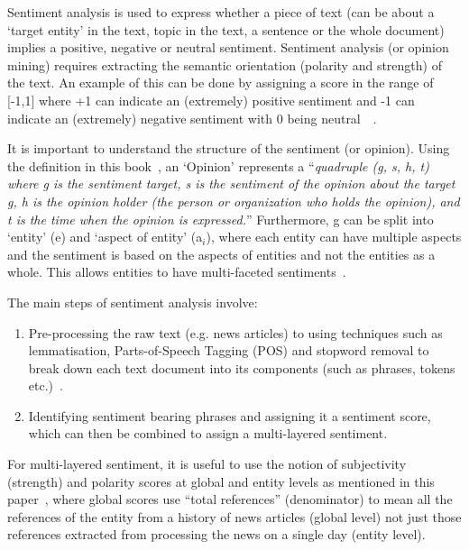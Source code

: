 Sentiment analysis is used to express whether a piece of text (can be about a `target entity' in the text, topic in the text, a sentence or the whole document) implies a positive, negative or neutral sentiment. Sentiment analysis (or opinion mining) requires extracting the semantic orientation (polarity and strength) of the text. An example of this can be done by assigning a score in the range of [-1,1] where +1 can indicate an (extremely) positive sentiment and -1 can indicate an (extremely) negative sentiment with 0 being neutral~\cite{16_liu2012sentiment}~\cite{18_kanakaraj2015nlp}. 

It is important to understand the structure of the sentiment (or opinion). Using the definition in this book~\cite{16_liu2012sentiment}, an `Opinion' represents a ``\textit{quadruple (g, s, h, t) where g is the sentiment target, s is the sentiment of the opinion about the target g,
h is the opinion holder (the person or organization who holds the opinion), and t is the time when the opinion is expressed.}'' Furthermore, g can be split into `entity' (e) and `aspect of entity' (a$_{i}$), where each entity can have multiple aspects and the sentiment is based on the aspects of entities and not the entities as a whole. This allows entities to have multi-faceted sentiments~\cite{18_kanakaraj2015nlp}. 

The main steps of sentiment analysis involve: 
\begin{enumerate}
\item Pre-processing the raw text (e.g. news articles) to using techniques such as lemmatisation, Parts-of-Speech Tagging (POS) and stopword removal to break down each text document into its components (such as phrases, tokens etc.)~\cite{17_benamara2007sentiment}.
\item Identifying sentiment bearing phrases and assigning it a sentiment score, which can then be combined to assign a multi-layered sentiment.
\end{enumerate}

For multi-layered sentiment, it is useful to use the notion of subjectivity (strength) and polarity scores at global and entity levels as mentioned in this paper~\cite{22_godbole2007large}, where global scores use ``total references'' (denominator) to mean all the references of the entity from a history of news articles (global level) not just those references extracted from processing the news on a single day (entity level).  

